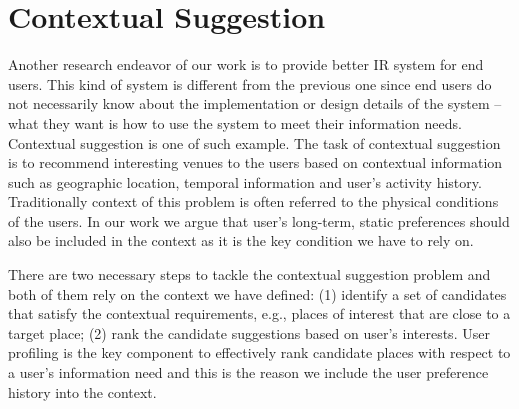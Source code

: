 \section{Contextual Suggestion}
Another research endeavor of our work is to provide better IR system for 
end users. This kind of system is different from the previous one since end 
users do not necessarily know about the implementation or design details of 
the system -- what they want is how to use the system to meet their information 
needs. Contextual suggestion is one of such example. 
The task of contextual suggestion is to recommend interesting venues to the 
users based on contextual information such as geographic location, 
temporal information and user's activity history. Traditionally context of 
this problem is often referred to the physical conditions of the users. 
In our work we argue that user's long-term, static preferences should also 
be included in the context as it is the key condition we have to rely on.

There are two necessary steps to tackle the contextual suggestion problem 
and both of them rely on the context we have defined: 
(1) identify a set of candidates that satisfy the contextual 
requirements, e.g., places of interest that are close to a target place; 
(2) rank the candidate suggestions based on user's interests. 
User profiling is the key component to effectively rank candidate places 
with respect to a user's information need and this is the reason we include 
the user preference history into the context. 

